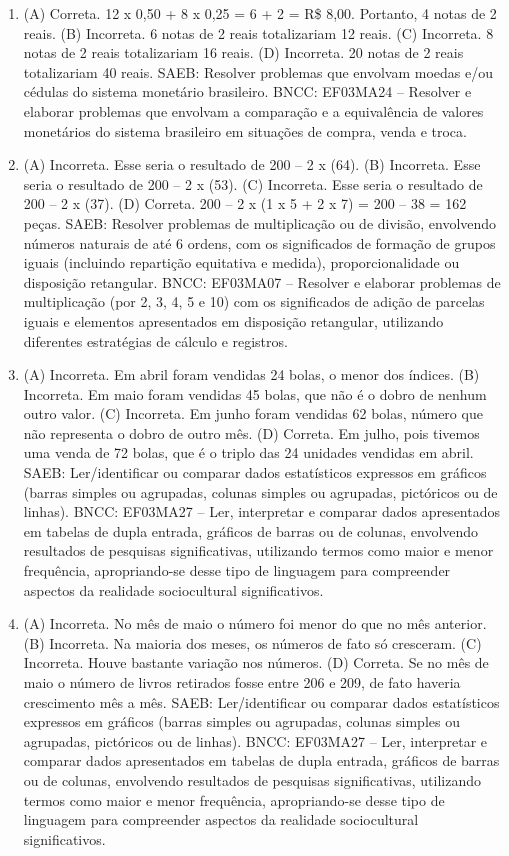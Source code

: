 \begin{enumerate}
\item
(A) Correta. 12 x 0,50 + 8 x 0,25 = 6 + 2 = R\$ 8,00. Portanto, 4 notas de 2 reais.
(B) Incorreta. 6 notas de 2 reais totalizariam 12 reais.
(C) Incorreta. 8 notas de 2 reais totalizariam 16 reais.
(D) Incorreta. 20 notas de 2 reais totalizariam 40 reais.
SAEB: Resolver problemas que envolvam moedas e/ou cédulas do sistema monetário brasileiro.
BNCC: EF03MA24 -- Resolver e elaborar problemas que envolvam a comparação e a equivalência de
valores monetários do sistema brasileiro em situações de compra, venda e troca.

\item
(A) Incorreta. Esse seria o resultado de 200 -- 2 x (64).
(B) Incorreta. Esse seria o resultado de 200 -- 2 x (53).
(C) Incorreta. Esse seria o resultado de 200 -- 2 x (37).
(D) Correta. 200 -- 2 x (1 x 5 + 2 x 7) = 200 -- 38 = 162 peças.
SAEB: Resolver problemas de multiplicação ou de divisão, envolvendo números naturais de até 6 ordens, com os significados de formação de grupos iguais (incluindo repartição equitativa e medida), proporcionalidade ou disposição retangular.
BNCC: EF03MA07 – Resolver e elaborar problemas de multiplicação (por 2, 3, 4, 5 e 10) com os
significados de adição de parcelas iguais e elementos apresentados em disposição retangular, utilizando diferentes estratégias de cálculo e registros.

\item
(A) Incorreta. Em abril foram vendidas 24 bolas, o menor dos índices.
(B) Incorreta. Em maio foram vendidas 45 bolas, que não é o dobro de nenhum outro valor.
(C) Incorreta. Em junho foram vendidas 62 bolas, número que não representa o dobro de outro mês.
(D) Correta. Em julho, pois tivemos uma venda de 72 bolas, que é o triplo das 24 unidades vendidas em abril.
SAEB: Ler/identificar ou comparar dados estatísticos
expressos em gráficos (barras simples ou agrupadas, colunas simples ou agrupadas, pictóricos ou de linhas).
BNCC: EF03MA27 -- Ler, interpretar e comparar dados apresentados em tabelas de dupla entrada,
gráficos de barras ou de colunas, envolvendo resultados de pesquisas significativas, utilizando
termos como maior e menor frequência, apropriando-se desse tipo de linguagem para compreender aspectos da realidade sociocultural significativos.

\item
(A) Incorreta. No mês de maio o número foi menor do que no mês anterior.
(B) Incorreta. Na maioria dos meses, os números de fato só cresceram.
(C) Incorreta. Houve bastante variação nos números.
(D) Correta. Se no mês de maio o número de livros retirados fosse entre 206 e 209, de fato haveria crescimento mês a mês.
SAEB: Ler/identificar ou comparar dados estatísticos
expressos em gráficos (barras simples ou agrupadas, colunas simples ou
agrupadas, pictóricos ou de linhas).
BNCC: EF03MA27 -- Ler, interpretar e comparar dados apresentados em tabelas de dupla entrada,
gráficos de barras ou de colunas, envolvendo resultados de pesquisas significativas, utilizando
termos como maior e menor frequência, apropriando-se desse tipo de linguagem para compreender aspectos da realidade sociocultural significativos.


\end{enumerate}
